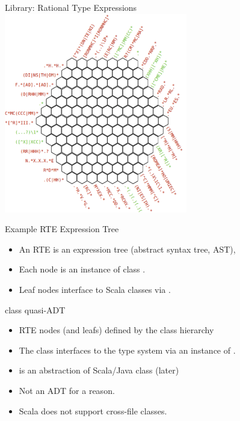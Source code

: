 \newsavebox\rteast
\begin{lrbox}{\rteast}
  \begin{minipage}{11cm}
    
  \end{minipage}
\end{lrbox}


{  

\begin{frame}{Library: }{Rational Type Expressions}
 \centering
  \includegraphics[width=0.6\textwidth]{relib.png}
\end{frame}
}

\begin{frame}{Example RTE Expression Tree}
  \usebox\rteast

  \medskip

  \centering

  \scalebox{0.7}{}
  \begin{itemize}
  \item An RTE is an expression tree (abstract syntax
    tree, AST),
  \item Each node is an instance of class .
  \item Leaf nodes interface to Scala classes via .
  \end{itemize}
\end{frame}

\begin{frame}{ class quasi-ADT}
  \scalebox{0.6}{}

  \medskip

  \begin{itemize}
  \item RTE nodes (and leafs) defined by the class hierarchy 
  \item The  class interfaces to the type system via an instance of .
  \item {} is an abstraction of Scala/Java class (later)
  \item Not an ADT for a  reason.
  \item Scala does not support cross-file  classes.
  \end{itemize}
\end{frame}

